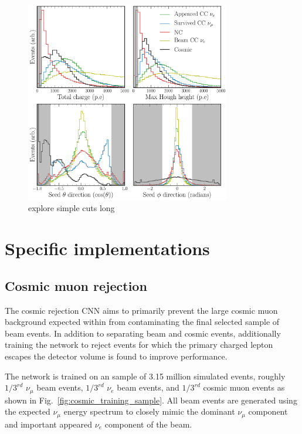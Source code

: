 \begin{figure} %
    \includegraphics[width=0.8\textwidth]{diagrams/6-cvn/chipsnet/explore_simple_cuts.pdf}
    \caption[explore simple cuts short]
    {explore simple cuts long}
    \label{fig:explore_simple_cuts}
\end{figure}

\section{Specific implementations} %
\label{sec:cvn_specific} %

\subsection{Cosmic muon rejection} %
\label{sec:cvn_specific_cosmic} %

The cosmic rejection CNN aims to primarily prevent the large cosmic muon background expected
within \chips from contaminating the final selected sample of beam events. In addition to
separating beam and cosmic events, additionally training the network to reject events for which
the primary charged lepton escapes the detector volume is found to improve performance.

The network is trained on an sample of 3.15 million simulated events, roughly $1/3^{rd}$
$\nu_{\mu}$ beam events, $1/3^{rd}$ $\nu_{e}$ beam events, and $1/3^{rd}$ cosmic muon events as
shown in Fig.~\ref{fig:cosmic_training_sample}. All beam events are generated using the expected
\chips $\nu_{\mu}$ energy spectrum to closely mimic the dominant $\nu_{\mu}$ component and
important appeared $\nu_{e}$ component of the beam.

